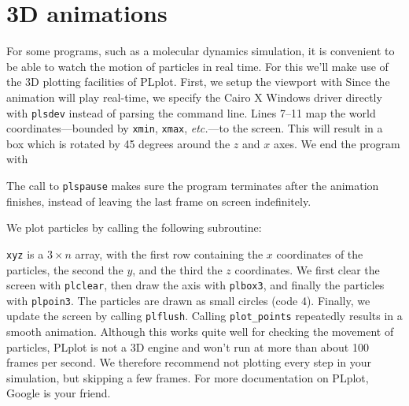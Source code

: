 \section{3D animations}

For some programs, such as a molecular dynamics simulation, it is convenient to be able to watch the motion of particles in real time.
For this we'll make use of the 3D plotting facilities of PLplot.
First, we setup the viewport with
Since the animation will play real-time, we specify the Cairo X Windows driver directly with \texttt{plsdev} instead of parsing the command line.
Lines 7--11 map the world coordinates---bounded by \texttt{xmin}, \texttt{xmax}, \emph{etc.}---to the screen.
This will result in a box which is rotated by 45 degrees around the $z$ and $x$ axes.
We end the program with

The call to \texttt{plspause} makes sure the program terminates after the animation finishes, instead of leaving the last frame on screen indefinitely.

We plot particles by calling the following subroutine:

\texttt{xyz} is a $3\times n$ array, with the first row containing the $x$ coordinates of the particles, the second the $y$, and the third the $z$ coordinates.
We first clear the screen with \texttt{plclear}, then draw the axis with \texttt{plbox3}, and finally the particles with \texttt{plpoin3}.
The particles are drawn as small circles (code 4).
Finally, we update the screen by calling \texttt{plflush}.
Calling \texttt{plot\_points} repeatedly results in a smooth animation.
Although this works quite well for checking the movement of particles, PLplot is not a 3D engine and won't run at more than about 100 frames per second.
We therefore recommend not plotting every step in your simulation, but skipping a few frames.
For more documentation on PLplot, Google is your friend.

